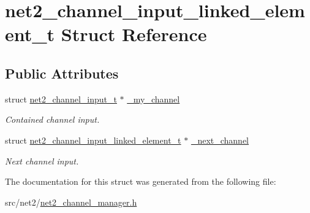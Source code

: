 \hypertarget{structnet2__channel__input__linked__element__t}{}\section{net2\+\_\+channel\+\_\+input\+\_\+linked\+\_\+element\+\_\+t Struct Reference}
\label{structnet2__channel__input__linked__element__t}
\subsection*{Public Attributes}
\begin{DoxyCompactItemize}
\item 
\hypertarget{structnet2__channel__input__linked__element__t_ad736ec541c37469b5e0e92f1bacc2a62}{}struct \hyperlink{structnet2__channel__input__t}{net2\+\_\+channel\+\_\+input\+\_\+t} $\ast$ \hyperlink{structnet2__channel__input__linked__element__t_ad736ec541c37469b5e0e92f1bacc2a62}{\+\_\+my\+\_\+channel}\label{structnet2__channel__input__linked__element__t_ad736ec541c37469b5e0e92f1bacc2a62}

\begin{DoxyCompactList}\small\item\em Contained channel input. \end{DoxyCompactList}\item 
\hypertarget{structnet2__channel__input__linked__element__t_a1b40af29290880f2edb70e6371ce0a50}{}struct \hyperlink{structnet2__channel__input__linked__element__t}{net2\+\_\+channel\+\_\+input\+\_\+linked\+\_\+element\+\_\+t} $\ast$ \hyperlink{structnet2__channel__input__linked__element__t_a1b40af29290880f2edb70e6371ce0a50}{\+\_\+next\+\_\+channel}\label{structnet2__channel__input__linked__element__t_a1b40af29290880f2edb70e6371ce0a50}

\begin{DoxyCompactList}\small\item\em Next channel input. \end{DoxyCompactList}\end{DoxyCompactItemize}


The documentation for this struct was generated from the following file\+:\begin{DoxyCompactItemize}
\item 
src/net2/\hyperlink{net2__channel__manager_8h}{net2\+\_\+channel\+\_\+manager.\+h}\end{DoxyCompactItemize}
